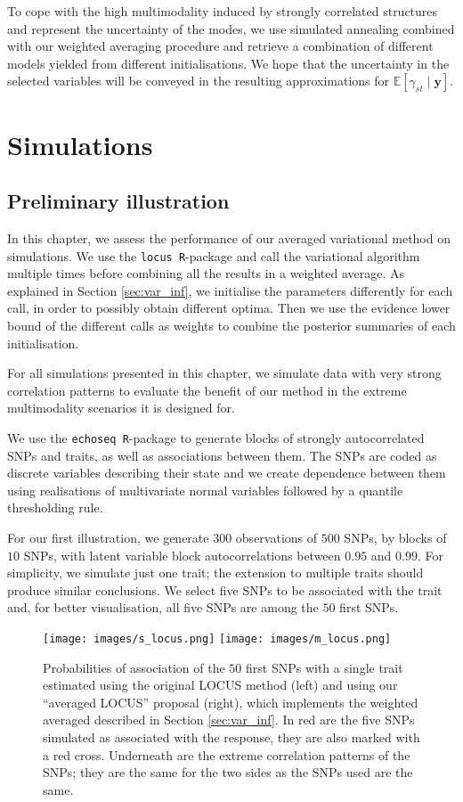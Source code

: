 \documentclass[a4paper, 11pt]{report}
\numberwithin{equation}{chapter}
\begin{document}
To cope with the high multimodality induced by strongly correlated structures and represent the uncertainty of the modes, we use simulated annealing combined with our weighted averaging procedure and retrieve a combination of different models yielded from different initialisations. We hope that the uncertainty in the selected variables will be conveyed in the resulting approximations for $\mathbb{E}\left[\gamma_{st}\mid \boldsymbol{y}\right]$.

\newpage
\chapter{Simulations}
\section{Preliminary illustration}
In this chapter, we assess the performance of our averaged variational method on simulations. We use the \texttt{locus R}-package \citep{r_locus} and call the variational algorithm multiple times before combining all the results in a weighted average. As explained in Section \ref{sec:var_inf}, we initialise the parameters differently for each call, in order to possibly obtain different optima. Then we use the evidence lower bound of the different calls as weights to combine the posterior summaries of each initialisation. 

For all simulations presented in this chapter, we simulate data with very strong correlation patterns to evaluate the benefit of our method in the extreme multimodality scenarios it is designed for.

We use the \texttt{echoseq R}-package \citep{r_echoseq} to generate blocks of strongly autocorrelated SNPs and traits, as well as associations between them. The SNPs are coded as discrete variables describing their state and we create dependence between them using realisations of multivariate normal variables followed by a quantile thresholding rule.

For our first illustration, we generate $300$ observations of $500$ SNPs, by blocks of $10$ SNPs, with latent variable block autocorrelations between $0.95$ and $0.99$. For simplicity, we simulate just one trait; the extension to multiple traits should produce similar conclusions. We select five SNPs to be associated with the trait and, for better visualisation, all five SNPs are among the $50$ first SNPs.


\begin{figure}[h]
\centering
\texttt{[image: images/s\_locus.png]}
\texttt{[image: images/m\_locus.png]}
\caption{\label{fig:simple_locus}Probabilities of association of the $50$ first SNPs with a single trait estimated using the original LOCUS method (left) and using our ``averaged LOCUS'' proposal (right), which implements the weighted averaged described in Section \ref{sec:var_inf}. In red are the five SNPs simulated as associated with the response, they are also marked with a red cross. Underneath are the extreme correlation patterns of the SNPs; they are the same for the two sides as the SNPs used are the same.}
\end{figure}
\end{document}
